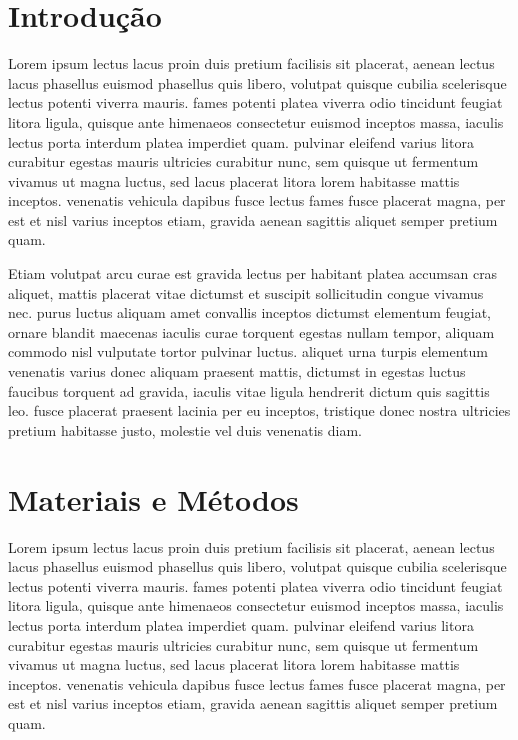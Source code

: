 \documentclass[journal,article,submit,moreauthors,pdftex,10pt,a4paper]{mdpi}
\begin{document}

\section{Introdução}

Lorem ipsum lectus lacus proin duis pretium facilisis sit placerat, aenean lectus lacus phasellus euismod phasellus quis libero, volutpat quisque cubilia scelerisque lectus potenti viverra mauris. fames potenti platea viverra odio tincidunt feugiat litora ligula, quisque ante himenaeos consectetur euismod inceptos massa, iaculis lectus porta interdum platea imperdiet quam. pulvinar eleifend varius litora curabitur egestas mauris ultricies curabitur nunc, sem quisque ut fermentum vivamus ut magna luctus, sed lacus placerat litora lorem habitasse mattis inceptos. venenatis vehicula dapibus fusce lectus fames fusce placerat magna, per est et nisl varius inceptos etiam, gravida aenean sagittis aliquet semper pretium quam. 

Etiam volutpat arcu curae est gravida lectus per habitant platea accumsan cras aliquet, mattis placerat vitae dictumst et suscipit sollicitudin congue vivamus nec. purus luctus aliquam amet convallis inceptos dictumst elementum feugiat, ornare blandit maecenas iaculis curae torquent egestas nullam tempor, aliquam commodo nisl vulputate tortor pulvinar luctus. aliquet urna turpis elementum venenatis varius donec aliquam praesent mattis, dictumst in egestas luctus faucibus torquent ad gravida, iaculis vitae ligula hendrerit dictum quis sagittis leo. fusce placerat praesent lacinia per eu inceptos, tristique donec nostra ultricies pretium habitasse justo, molestie vel duis venenatis diam. 
 

\section{Materiais e Métodos}

Lorem ipsum lectus lacus proin duis pretium facilisis sit placerat, aenean lectus lacus phasellus euismod phasellus quis libero, volutpat quisque cubilia scelerisque lectus potenti viverra mauris. fames potenti platea viverra odio tincidunt feugiat litora ligula, quisque ante himenaeos consectetur euismod inceptos massa, iaculis lectus porta interdum platea imperdiet quam. pulvinar eleifend varius litora curabitur egestas mauris ultricies curabitur nunc, sem quisque ut fermentum vivamus ut magna luctus, sed lacus placerat litora lorem habitasse mattis inceptos. venenatis vehicula dapibus fusce lectus fames fusce placerat magna, per est et nisl varius inceptos etiam, gravida aenean sagittis aliquet semper pretium quam. 
\end{document}
